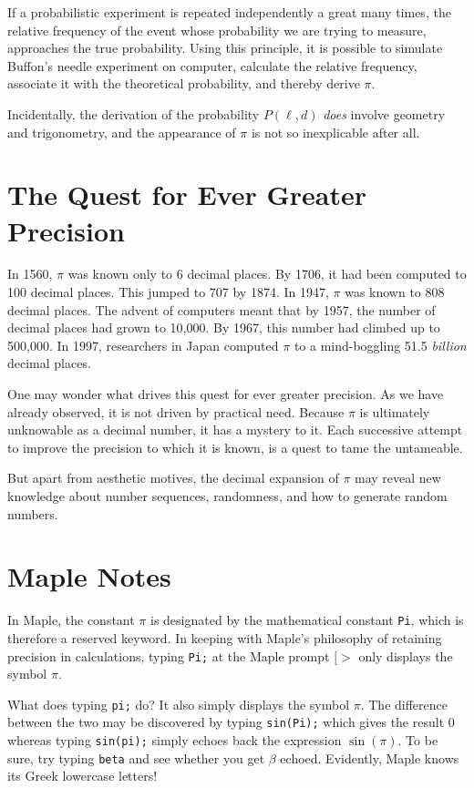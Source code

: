 \documentclass[11pt,a4paper,onecolumn]{article}
\newcommand{\map}{Maple}
\newcommand{\maps}{Maple }
\begin{document}
If a probabilistic experiment is repeated independently a great many
times, the relative frequency of the event whose probability we are
trying to measure, approaches the true probability.  Using this
principle, it is possible to simulate Buffon's needle experiment on
computer, calculate the relative frequency, associate it with the
theoretical probability, and thereby derive $\pi$.

Incidentally, the derivation of the probability $P(\ell, d)$ \emph{does}
involve geometry and trigonometry, and the appearance of $\pi$ is not so
inexplicable after all.

\section{The Quest for Ever Greater Precision}\label{sec:precision}

In 1560, $\pi$ was known only to 6 decimal places.  By 1706, it had
been computed to 100 decimal places.  This jumped to 707 by 1874.  In
1947, $\pi$ was known to 808 decimal places.  The advent of computers
meant that by 1957, the number of decimal places had grown to 10,000.
By 1967, this number had climbed up to 500,000.  In 1997, researchers
in Japan computed $\pi$ to a mind-boggling 51.5 \emph{billion} decimal
places.

One may wonder what drives this quest for ever greater precision.  As
we have already observed, it is not driven by practical need.  Because
$\pi$ is ultimately unknowable as a decimal number, it has a mystery to
it.  Each successive attempt to improve the precision to which it is
known, is a quest to tame the untameable.

But apart from aesthetic motives, the decimal expansion of $\pi$ may reveal new knowledge about number sequences, randomness, and how to generate random numbers. 
  
\section{Maple Notes}

In \map, the constant $\pi$ is designated by the mathematical constant \texttt{Pi}, which is therefore a reserved keyword.  In keeping with Maple's philosophy of retaining precision in calculations, typing \texttt{Pi;} at the \maps prompt $[>$ only displays the symbol $\pi$.

What does typing \texttt{pi;} do?  It also simply displays the symbol $\pi$.  The difference between the two may be discovered by typing \texttt{sin(Pi);} which gives the result $0$ whereas typing \texttt{sin(pi);} simply echoes back the expression $\sin(\pi)$.  To be sure, try typing \texttt{beta} and see whether you get $\beta$ echoed.  Evidently, \maps knows its Greek lowercase letters!
\end{document}
